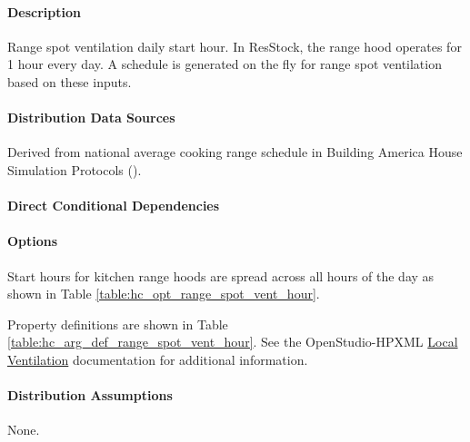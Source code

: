 \paragraph{Description}
% 
Range spot ventilation daily start hour. In ResStock, the range hood operates for 1 hour every day. A schedule is generated on the fly for range spot ventilation based on these inputs.

\paragraph{Distribution Data Sources}
% 
Derived from national average cooking range schedule in Building America House Simulation Protocols (\cite{Wilson2014}). 

\paragraph{Direct Conditional Dependencies}


\paragraph{Options}
Start hours for kitchen range hoods are spread across all hours of the day as shown in Table \ref{table:hc_opt_range_spot_vent_hour}.



Property definitions are shown in Table \ref{table:hc_arg_def_range_spot_vent_hour}. See the OpenStudio-HPXML \href{https://openstudio-hpxml.readthedocs.io/en/v1.10.0/workflow_inputs.html#hpxml-local-ventilation-fans}{Local Ventilation} documentation for additional information.



\paragraph{Distribution Assumptions}
% 
None.
